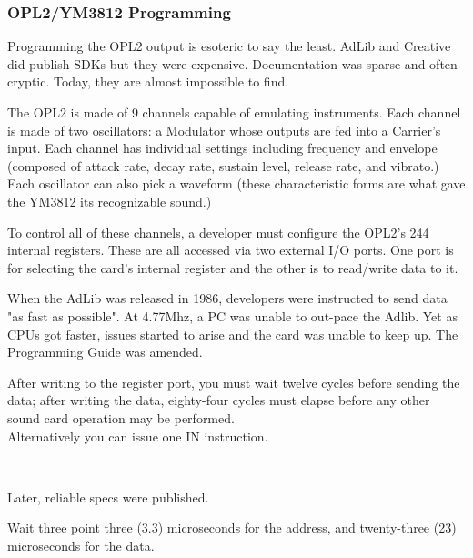 \subsubsection{OPL2/YM3812 Programming}
\par
Programming the OPL2 output is esoteric to say the least. AdLib and Creative did publish SDKs but they were expensive.  Documentation was sparse and often cryptic. Today, they are almost impossible to find.\\
\par
The OPL2 is made of 9 channels capable of emulating instruments. Each channel is made of two oscillators: a Modulator whose outputs are fed into a Carrier's input. Each channel has individual settings including frequency and envelope (composed of attack rate, decay rate, sustain level, release rate, and vibrato.) Each oscillator can also pick a waveform (these characteristic forms are what gave the YM3812 its recognizable sound.)\\
\par
 To control all of these channels, a developer must configure the OPL2's 244 internal registers. These are all accessed via two external I/O ports. One port is for selecting the card's internal register and the other is to read/write data to it.\\
\par
\begin{minipage}{\textwidth}

\end{minipage}
\par
When the AdLib was released in 1986, developers were instructed to send data "as fast as possible". At 4.77Mhz, a PC was unable to out-pace the Adlib. Yet as CPUs got faster, issues started to arise and the card was unable to keep up. The Programming Guide was amended.\\
\par

\begin{fancyquotes}
After writing to the register port, you must wait twelve cycles before sending the data; after writing the data, eighty-four cycles must elapse before any other sound card operation may be performed\protect\footnotemark.
 \bigskip \\
 Alternatively you can issue one IN instruction.
 \bigskip \\
 \end{fancyquotes}
\\
\par
Later, reliable specs were published.\\
\par
\begin{fancyquotes}
Wait three point three (3.3) microseconds for the address, and twenty-three (23) microseconds for the data.\\
 \end{fancyquotes}
 

